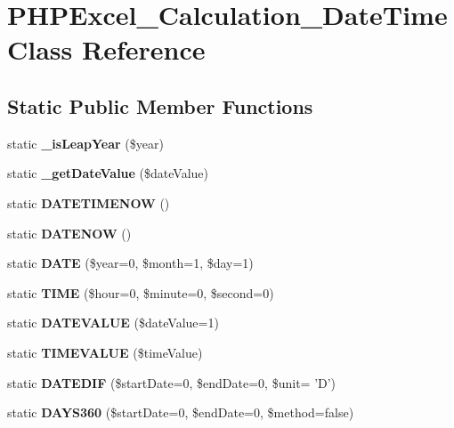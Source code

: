 \section{P\+H\+P\+Excel\+\_\+\+Calculation\+\_\+\+Date\+Time Class Reference}
\label{class_p_h_p_excel___calculation___date_time}
\subsection*{Static Public Member Functions}
\begin{DoxyCompactItemize}
\item 
static {\bf \+\_\+is\+Leap\+Year} (\$year)
\item 
static {\bf \+\_\+get\+Date\+Value} (\$date\+Value)
\item 
static {\bfseries D\+A\+T\+E\+T\+I\+M\+E\+N\+O\+W} ()\label{class_p_h_p_excel___calculation___date_time_a151995fed48eec391ec53e807d6532e0}

\item 
static {\bfseries D\+A\+T\+E\+N\+O\+W} ()\label{class_p_h_p_excel___calculation___date_time_a6fc755e4b3125c150c44129fa27346ab}

\item 
static {\bfseries D\+A\+T\+E} (\$year=0, \$month=1, \$day=1)\label{class_p_h_p_excel___calculation___date_time_a03b0fe170b61e5a1c2029cb36c862c73}

\item 
static {\bfseries T\+I\+M\+E} (\$hour=0, \$minute=0, \$second=0)\label{class_p_h_p_excel___calculation___date_time_a9e7e0f08b762776c916a9a539400452d}

\item 
static {\bfseries D\+A\+T\+E\+V\+A\+L\+U\+E} (\$date\+Value=1)\label{class_p_h_p_excel___calculation___date_time_a8984d40537ff269263bce62c77541136}

\item 
static {\bfseries T\+I\+M\+E\+V\+A\+L\+U\+E} (\$time\+Value)\label{class_p_h_p_excel___calculation___date_time_a6211ca53e1f0762c7c73d04f4e98c816}

\item 
static {\bf D\+A\+T\+E\+D\+I\+F} (\$start\+Date=0, \$end\+Date=0, \$unit= 'D')
\item 
static {\bfseries D\+A\+Y\+S360} (\$start\+Date=0, \$end\+Date=0, \$method=false)\label{class_p_h_p_excel___calculation___date_time_a1013ea265a0afd8c3222f50b4af18f00}


\end{DoxyCompactItemize}
